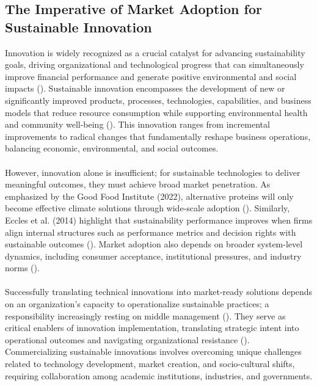 	\subsection{The Imperative of Market Adoption for Sustainable Innovation}
	Innovation is widely recognized as a crucial catalyst for advancing sustainability goals, driving organizational and technological progress that can simultaneously improve financial performance and generate positive environmental and social impacts (\textcite{Boons2013, Schiederig2012}). Sustainable innovation encompasses the development of new or significantly improved products, processes, technologies, capabilities, and business models that reduce resource consumption while supporting environmental health and community well-being (\textcite{Adams2016}). This innovation ranges from incremental improvements to radical changes that fundamentally reshape business operations, balancing economic, environmental, and social outcomes.
	
	\paragraph*{} However, innovation alone is insufficient; for sustainable technologies to deliver meaningful outcomes, they must achieve broad market penetration. As emphasized by the Good Food Institute (2022), alternative proteins will only become effective climate solutions through wide-scale adoption (\textcite{GFI2022}). Similarly, Eccles et al. (2014) highlight that sustainability performance improves when firms align internal structures such as performance metrics and decision rights with sustainable outcomes (\textcite{Eccles2014}). Market adoption also depends on broader system-level dynamics, including consumer acceptance, institutional pressures, and industry norms (\textcite{Hall2003, Geels2002}).
	
	\paragraph*{} Successfully translating technical innovations into market-ready solutions depends on an organization’s capacity to operationalize sustainable practices; a responsibility increasingly resting on middle management (\textcite{Rafaeli2022}). They serve as critical enablers of innovation implementation, translating strategic intent into operational outcomes and navigating organizational resistance (\textcite{birkinshaw2004}). Commercializing sustainable innovations involves overcoming unique challenges related to technology development, market creation, and socio-cultural shifts, requiring collaboration among academic institutions, industries, and governments.
	
